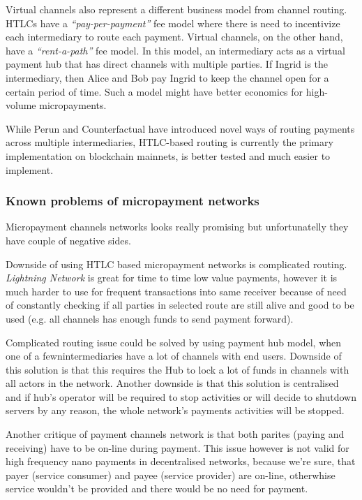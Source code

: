\documentclass[a4paper,12pt]{article}
\begin{document}
Virtual channels also represent a different business model from channel routing.
HTLCs have a \textit{“pay-per-payment”} fee model where there is need to 
incentivize each intermediary to route each payment. Virtual channels, on the 
other hand, have a \textit{“rent-a-path”} fee model. In this model, an 
intermediary acts as a virtual payment hub that has direct channels with multiple
parties. If Ingrid is the intermediary, then Alice and Bob pay Ingrid to keep 
the channel open for a certain period of time. Such a model might have better 
economics for high-volume micropayments.

While Perun and Counterfactual have introduced novel ways of routing payments 
across multiple intermediaries, HTLC-based routing is currently the primary 
implementation on blockchain mainnets, is better tested and much easier to 
implement.

\subsubsection{Known problems of micropayment networks}

Micropayment channels networks looks really promising but unfortunatelly they 
have couple of negative sides. 

Downside of using HTLC based micropayment networks is complicated routing. 
\textit{Lightning Network} is great for time to time low value payments, however 
it is much harder to use for frequent transactions into same receiver because of 
need of constantly checking if all parties in selected route are still alive and 
good to be used (e.g. all channels has enough funds to send payment forward).

Complicated routing issue could be solved by using payment hub model, when one 
of a fewnintermediaries have a lot of channels with end users. Downside of this 
solution is that this requires the Hub to lock a lot of funds in channels with 
all actors in the network. Another downside is that this solution is centralised 
and if hub's operator will be required to stop activities or will decide to 
shutdown servers by any reason, the whole network's payments activities will be 
stopped.

Another critique of payment channels network is that both parites (paying and 
receiving) have to be on-line during payment. This issue however is not valid for 
high frequency nano payments in decentralised networks, because we're sure, that
payer (service consumer) and payee (service provider) are on-line, otherwhise 
service wouldn't be provided and there would be no need for payment.
\end{document}
